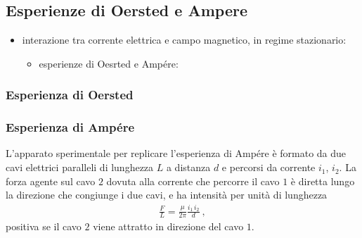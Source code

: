 \documentclass[letterpaper,10pt,italian]{jupyterBook}
\begin{document}
\subsection{Esperienze di Oersted e Ampere}
\label{\detokenize{ch/electromagnetism/electromagnetism-steady:esperienze-di-oersted-e-ampere}}\label{\detokenize{ch/electromagnetism/electromagnetism-steady:physics-hs-electromagnetism-electromagnetism-steady-experience-oersted-ampere}}\begin{itemize}
\item {} 
\sphinxAtStartPar
interazione tra corrente elettrica e campo magnetico, in regime stazionario:
\begin{itemize}
\item {} 
\sphinxAtStartPar
esperienze di Oesrted e Ampére:

\end{itemize}

\end{itemize}


\subsubsection{Esperienza di Oersted}
\label{\detokenize{ch/electromagnetism/electromagnetism-steady:esperienza-di-oersted}}\label{\detokenize{ch/electromagnetism/electromagnetism-steady:physics-hs-electromagnetism-electromagnetism-steady-experience-oersted-ampere-oersted}}

\subsubsection{Esperienza di Ampére}
\label{\detokenize{ch/electromagnetism/electromagnetism-steady:esperienza-di-ampere}}\label{\detokenize{ch/electromagnetism/electromagnetism-steady:physics-hs-electromagnetism-electromagnetism-steady-experience-oersted-ampere-ampere}}
\sphinxAtStartPar
L’apparato sperimentale per replicare l’esperienza di Ampére è formato da due cavi elettrici paralleli di lunghezza \(L\) a distanza \(d\) e percorsi da corrente \(i_1\), \(i_2\). La forza agente sul cavo \(2\) dovuta alla corrente che percorre il cavo \(1\) è diretta lungo la direzione che congiunge i due cavi, e ha intensità per unità di lunghezza
\begin{equation*}
\begin{split}\frac{F}{L} = \frac{\mu}{2 \pi} \frac{i_1 \, i_2}{d} \ ,\end{split}
\end{equation*}
\sphinxAtStartPar
positiva se il cavo \(2\) viene attratto in direzione del cavo \(1\).
\end{document}
